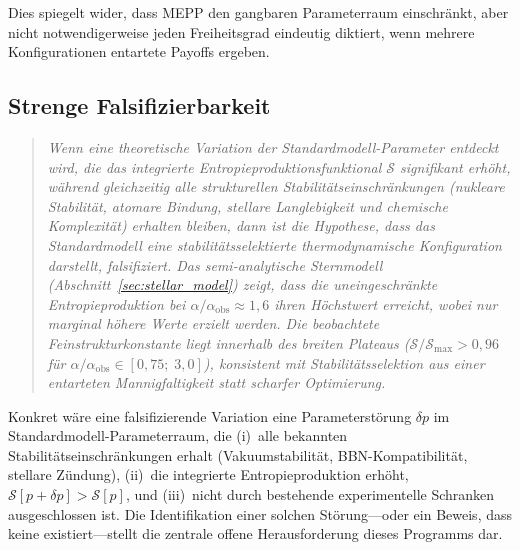 \documentclass[12pt,a4paper]{article}
\theoremstyle{remark}
\begin{document}
Dies spiegelt wider, dass MEPP den gangbaren Parameterraum einschr\"ankt, aber nicht notwendigerweise jeden Freiheitsgrad eindeutig diktiert, wenn mehrere Konfigurationen entartete Payoffs ergeben.

\subsection{Strenge Falsifizierbarkeit}

\begin{quote}
\textit{Wenn eine theoretische Variation der Standardmodell-Parameter entdeckt wird, die das integrierte Entropieproduktionsfunktional $\mathcal{S}$ signifikant erh\"oht, w\"ahrend gleichzeitig alle strukturellen Stabilit\"atseinschr\"ankungen (nukleare Stabilit\"at, atomare Bindung, stellare Langlebigkeit und chemische Komplexit\"at) erhalten bleiben, dann ist die Hypothese, dass das Standardmodell eine stabilit\"atsselektierte thermodynamische Konfiguration darstellt, falsifiziert. Das semi-analytische Sternmodell (Abschnitt~\ref{sec:stellar_model}) zeigt, dass die uneingeschr\"ankte Entropieproduktion bei $\alpha/\alpha_{\mathrm{obs}} \approx 1{,}6$ ihren H\"ochstwert erreicht, wobei nur marginal h\"ohere Werte erzielt werden. Die beobachtete Feinstrukturkonstante liegt innerhalb des breiten Plateaus ($\mathcal{S}/\mathcal{S}_{\max} > 0{,}96$ f\"ur $\alpha/\alpha_{\mathrm{obs}} \in [0{,}75;\; 3{,}0]$), konsistent mit Stabilit\"atsselektion aus einer entarteten Mannigfaltigkeit statt scharfer Optimierung.}
\end{quote}

\noindent Konkret w\"are eine falsifizierende Variation eine Parameterst\"orung $\delta p$ im Standardmodell-Parameterraum, die (i)~alle bekannten Stabilit\"atseinschr\"ankungen erhalt (Vakuumstabilit\"at, BBN-Kompatibilit\"at, stellare Z\"undung), (ii)~die integrierte Entropieproduktion erh\"oht, $\mathcal{S}[p + \delta p] > \mathcal{S}[p]$, und (iii)~nicht durch bestehende experimentelle Schranken ausgeschlossen ist. Die Identifikation einer solchen St\"orung---oder ein Beweis, dass keine existiert---stellt die zentrale offene Herausforderung dieses Programms dar.
\end{document}
